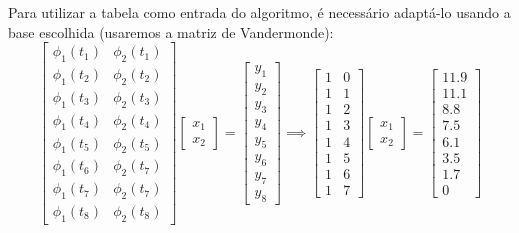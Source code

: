 \documentclass[a4paper,11pt]{article}
\begin{document}
        Para utilizar a tabela como entrada do algoritmo, é necessário adaptá-lo usando a base escolhida (usaremos a matriz de Vandermonde):
        $$
            \begin{bmatrix}
                \phi_1(t_1) & \phi_2(t_1) \\
                \phi_1(t_2) & \phi_2(t_2) \\
                \phi_1(t_3) & \phi_2(t_3) \\
                \phi_1(t_4) & \phi_2(t_4) \\
                \phi_1(t_5) & \phi_2(t_5) \\
                \phi_1(t_6) & \phi_2(t_7) \\
                \phi_1(t_7) & \phi_2(t_7) \\
                \phi_1(t_8) & \phi_2(t_8)
            \end{bmatrix}
            \begin{bmatrix}
                x_1 \\ 
                x_2
            \end{bmatrix}
            =
            \begin{bmatrix}
                y_1 \\ 
                y_2 \\
                y_3 \\ 
                y_4 \\
                y_5 \\
                y_6 \\
                y_7 \\
                y_8
            \end{bmatrix}
            \implies
            \begin{bmatrix}
                1 & 0 \\
                1 & 1 \\
                1 & 2 \\
                1 & 3 \\
                1 & 4 \\
                1 & 5 \\
                1 & 6 \\
                1 & 7
            \end{bmatrix}
            \begin{bmatrix}
                x_1 \\ 
                x_2
            \end{bmatrix}
            =
            \begin{bmatrix}
                11.9 \\ 
                11.1 \\
                8.8 \\ 
                7.5 \\
                6.1 \\
                3.5 \\ 
                1.7 \\
                0
            \end{bmatrix}
        $$
        
\end{document}
